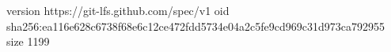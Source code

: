 version https://git-lfs.github.com/spec/v1
oid sha256:ea116e628c6738f68e6c12ce472fdd5734e04a2c5fe9cd969c31d973ca792955
size 1199
